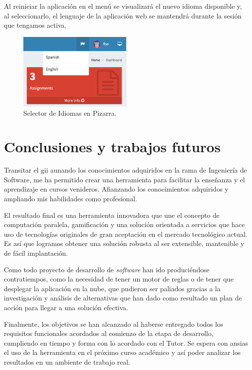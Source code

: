 \documentclass[11pt,spanish,listoffigures,listoftables]{tfgetsinf}
\begin{document}
Al reiniciar la aplicación en el menú se visualizará el nuevo idioma disponible y, al seleccionarlo, el lenguaje de la aplicación web se mantendrá durante la sesión que tengamos activa.

\begin{figure}[!ht]
	\centering
	\includegraphics[width=0.50\textwidth]{img/pizarra-new-language}
	\caption[Selector de Idiomas en Pizarra]{Selector de Idiomas en Pizarra.}
	\label{figura:pizarra-new-language}
\end{figure}

\chapter{Conclusiones y trabajos futuros}

Transitar el \acrlong{gii} aunando los conocimientos adquiridos en la rama de Ingeniería de Software, me ha permitido crear una herramienta para facilitar la enseñanza y el aprendizaje en cursos venideros. Afianzando los conocimientos adquiridos y ampliando mis habilidades como profesional.

El resultado final es una herramienta innovadora que une el concepto de computación paralela, gamificación y una solución orientada a servicios que hace uso de tecnologías originales de gran aceptación en el mercado tecnológico actual. Es así que logramos obtener una solución robusta al ser extensible, mantenible y de fácil implantación.

Como todo proyecto de desarrollo de \textit{software} han ido produciéndose contratiempos, como la necesidad de tener un motor de reglas o de tener que desplegar la aplicación en la nube, que pudieron ser paliados gracias a la investigación y análisis de alternativas que han dado como resultado un plan de acción para llegar a una solución efectiva.

Finalmente, los objetivos se han alcanzado al haberse entregado todos los requisitos funcionales acordados al comienzo de la etapa de desarrollo, cumpliendo en tiempo y forma con lo acordado con el Tutor. Se espera con ansias el uso de la herramienta en el próximo curso académico y así poder analizar los resultados en un ambiente de trabajo real.
\end{document}
